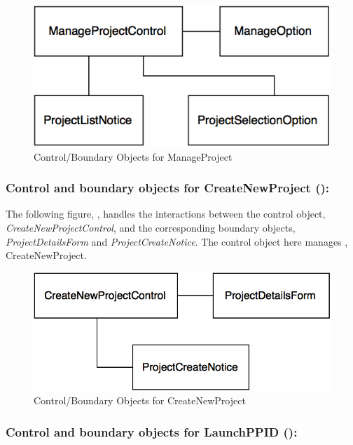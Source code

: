 \documentclass[12pt,letterpaper]{article}
\begin{document}
\vspace{1em}

\begin{figure}[H]
	\centering{}
	\includegraphics[scale=0.37]{imgs/cbod/manage-project.png}
	\caption{Control/Boundary Objects for ManageProject}
\end{figure}

\newpage{}

\subsubsection*{Control and boundary objects for CreateNewProject ():}

The following figure, , handles the interactions between the control object, {\it CreateNewProjectControl}, and the corresponding boundary objects, {\it ProjectDetailsForm} and {\it ProjectCreateNotice}. The control object here manages , CreateNewProject.

\begin{figure}[H]
	\centering{}
	\includegraphics[scale=0.37]{imgs/cbod/create-new-project.png}
	\caption{Control/Boundary Objects for CreateNewProject}
\end{figure}

\subsubsection*{Control and boundary objects for LaunchPPID ():}
\end{document}
